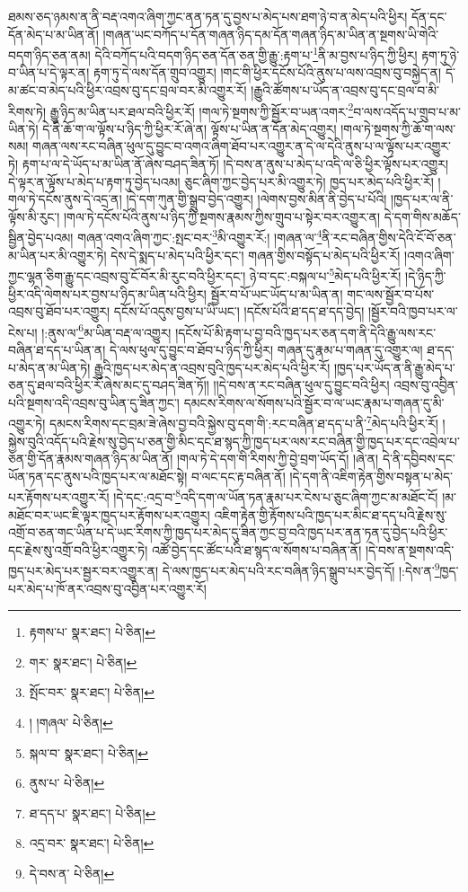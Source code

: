 ཐམས་ཅད་ཉམས་ན་ནི་བརྡ་འགའ་ཞིག་ཀྱང་ནན་ཏན་དུ་བྱས་པ་མེད་པས་ཐག་ཉེ་བ་ན་མེད་པའི་ཕྱིར། དོན་དང་དོན་མེད་པ་མ་ཡིན་ནོ། །གཞན་ཡང་བཀོད་པ་དོན་གཞན་ཉིད་དམ་དོན་གཞན་ཉིད་མ་ཡིན་ན་སྔགས་ཡི་གེའི་བདག་ཉིད་ཅན་ནམ། དེའི་བཀོད་པའི་བདག་ཉིད་ཅན་དོན་ཅན་གྱི་རྒྱུ་:རྟག་པ་\footnote{རྟགས་པ་  སྣར་ཐང་།  པེ་ཅིན། }ནི་མ་བྱས་པ་ཉིད་ཀྱི་ཕྱིར། རྟག་ཏུ་ཉེ་བ་ཡིན་པ་དེ་ལྟར་ན། རྟག་ཏུ་དེ་ལས་དོན་གྲུབ་འགྱུར། །གང་གི་ཕྱིར་དངོས་པོའི་ནུས་པ་ལས་འབྲས་བུ་བསྐྱེད་ན། དེ་མ་ཚང་བ་མེད་པའི་ཕྱིར་འབྲས་བུ་དང་བྲལ་བར་མི་འགྱུར་རོ། །རྒྱུའི་ཚོགས་པ་ཡོད་ན་འབྲས་བུ་དང་བྲལ་བ་མི་རིགས་ཏེ། རྒྱུ་ཉིད་མ་ཡིན་པར་ཐལ་བའི་ཕྱིར་རོ། །གལ་ཏེ་སྔགས་ཀྱི་སྦྱོར་བ་ཡན་འགར་\footnote{གར་  སྣར་ཐང་།  པེ་ཅིན། }བ་ལས་འདོད་པ་གྲུབ་པ་མ་ཡིན་ཏེ། དེ་ནི་ཆོ་ག་ལ་ལྟོས་པ་ཉིད་ཀྱི་ཕྱིར་རོ་ཞེ་ན། ལྟོས་པ་ཡིན་ན་དོན་མེད་འགྱུར། །གལ་ཏེ་སྔགས་ཀྱི་ཆོ་ག་ལས་སམ། གཞན་ལས་རང་བཞིན་ཕུལ་དུ་བྱུང་བ་འགའ་ཞིག་ཐོབ་པར་འགྱུར་ན་དེ་ལ་དེའི་ནུས་པ་ལ་ལྟོས་པར་འགྱུར་ཏེ། རྟག་པ་ལ་དེ་ཡོད་པ་མ་ཡིན་ནོ་ཞེས་བཤད་ཟིན་ཏོ། །དེ་བས་ན་ནུས་པ་མེད་པ་འདི་ལ་ཅི་ཕྱིར་ལྟོས་པར་འགྱུར། དེ་ལྟར་ན་ལྟོས་པ་མེད་པ་རྟག་ཏུ་བྱེད་པའམ། ཅུང་ཞིག་ཀྱང་བྱེད་པར་མི་འགྱུར་ཏེ། ཁྱད་པར་མེད་པའི་ཕྱིར་རོ། །གལ་ཏེ་དངོས་ནུས་དེ་འདྲ་ན། །དེ་དག་ཀུན་གྱི་སྒྲུབ་བྱེད་འགྱུར། །ལེགས་བྱས་མིན་ནི་བྱེད་པ་པོའི། །ཁྱད་པར་ལ་ནི་ལྟོས་མི་རུང་། །གལ་ཏེ་དངོས་པོའི་ནུས་པ་ཉིད་ཀྱི་སྔགས་རྣམས་ཀྱིས་གྲུབ་པ་སྟེར་བར་འགྱུར་ན། དེ་དག་གིས་མཆོད་སྦྱིན་བྱེད་པའམ། གཞན་འགའ་ཞིག་ཀྱང་:སྤང་བར་\footnote{སྤོང་བར་  སྣར་ཐང་།  པེ་ཅིན། }མི་འགྱུར་རོ:། །གཞན་ལ་\footnote{། །གཞལ་  པེ་ཅིན། }ནི་རང་བཞིན་གྱིས་དེའི་ངོ་བོ་ཅན་མ་ཡིན་པར་མི་འགྱུར་ཏེ། དེས་དེ་སྨད་པ་མེད་པའི་ཕྱིར་དང་། གཞན་གྱིས་བསྟོད་པ་མེད་པའི་ཕྱིར་རོ། །འགའ་ཞིག་ཀྱང་ལྷན་ཅིག་རྒྱུ་དང་འབྲས་བུ་ངོ་བོར་མི་རུང་བའི་ཕྱིར་དང་། ཉེ་བ་དང་:བསྐལ་པ་\footnote{སྐལ་བ་  སྣར་ཐང་།  པེ་ཅིན། }མེད་པའི་ཕྱིར་རོ། །དེ་ཉིད་ཀྱི་ཕྱིར་འདི་ལེགས་པར་བྱས་པ་ཉིད་མ་ཡིན་པའི་ཕྱིར། སྦྱོར་བ་པོ་ཡང་ཡོད་པ་མ་ཡིན་ན། གང་ལས་སྦྱོར་བ་པོས་འབྲས་བུ་ཐོབ་པར་འགྱུར། དངོས་པོ་འདུས་བྱས་པ་ཡི་ཡང་། །དངོས་པོའི་ཐ་དད་ཐ་དད་བྱེད། །སྦྱོར་བའི་ཁྱབ་པར་ལ་ངེས་པ། །:ནུས་ལ་\footnote{ནུས་པ་  པེ་ཅིན། }མ་ཡིན་བརྡ་ལ་འགྱུར། །དངོས་པོ་མི་རྟག་པ་བྱ་བའི་ཁྱད་པར་ཅན་དག་ནི་དེའི་རྒྱུ་ལས་རང་བཞིན་ཐ་དད་པ་ཡིན་ན། དེ་ལས་ཕུལ་དུ་བྱུང་བ་ཐོབ་པ་ཉིད་ཀྱི་ཕྱིར། གཞན་དུ་རྣམ་པ་གཞན་དུ་འགྱུར་ལ། ཐ་དད་པ་མེད་ན་མ་ཡིན་ཏེ། རྒྱུའི་ཁྱད་པར་མེད་ན་འབྲས་བུའི་ཁྱད་པར་མེད་པའི་ཕྱིར་རོ། །ཁྱད་པར་ཡོད་ན་ནི་རྒྱུ་མེད་པ་ཅན་དུ་ཐལ་བའི་ཕྱིར་རོ་ཞེས་མང་དུ་བཤད་ཟིན་ཏོ།། །།དེ་བས་ན་རང་བཞིན་ཕུལ་དུ་བྱུང་བའི་ཕྱིར། འབྲས་བུ་འབྱིན་པའི་སྔགས་འདི་འབྲས་བུ་ཡིན་དུ་ཟིན་ཀྱང་། དམངས་རིགས་ལ་སོགས་པའི་སྦྱོར་བ་ལ་ཡང་རྣམ་པ་གཞན་དུ་མི་འགྱུར་ཏེ། དམངས་རིགས་དང་བྲམ་ཟེ་ཞེས་བྱ་བའི་སྐྱེས་བུ་དག་གི་:རང་བཞིན་ཐ་དད་པ་ནི་\footnote{ཐ་དད་པ་  སྣར་ཐང་།  པེ་ཅིན། }མེད་པའི་ཕྱིར་རོ། །སྐྱེས་བུའི་འདོད་པའི་རྗེས་སུ་བྱེད་པ་ཅན་གྱི་མིང་དང་ཐ་སྙད་ཀྱི་ཁྱད་པར་ལས་རང་བཞིན་གྱི་ཁྱད་པར་དང་འབྲེལ་པ་ཅན་གྱི་དོན་རྣམས་གཞན་ཉིད་མ་ཡིན་ནོ། །གལ་ཏེ་དེ་དག་གི་རིགས་ཀྱི་བྱེ་བྲག་ཡོད་དོ། །ཞེ་ན། དེ་ནི་དབྱིབས་དང་ཡོན་ཏན་དང་ནུས་པའི་ཁྱད་པར་ལ་མཐོང་སྟེ། བ་ལང་དང་རྟ་བཞིན་ནོ། །དེ་དག་ནི་འཇིག་རྟེན་གྱིས་བསྟན་པ་མེད་པར་རྟོགས་པར་འགྱུར་རོ། །དེ་དང་:འདྲ་བ་\footnote{འདྲ་བར་  སྣར་ཐང་།  པེ་ཅིན། }འདི་དག་ལ་ཡོན་ཏན་རྣམ་པར་ངེས་པ་ཅུང་ཞིག་ཀྱང་མ་མཐོང་ངོ། །མ་མཐོང་བར་ཡང་ཇི་ལྟར་ཁྱད་པར་རྟོགས་པར་འགྱུར། འཇིག་རྟེན་གྱི་རྟོགས་པའི་ཁྱད་པར་མིང་ཐ་དད་པའི་རྗེས་སུ་འགྲོ་བ་ཅན་གང་ཡིན་པ་དེ་ཡང་རིགས་ཀྱི་ཁྱད་པར་མེད་དུ་ཟིན་ཀྱང་བྱ་བའི་ཁྱད་པར་ནན་ཏན་དུ་བྱེད་པའི་ཕྱིར་དང་རྗེས་སུ་འགྲོ་བའི་ཕྱིར་འགྱུར་ཏེ། འཚོ་བྱེད་དང་ཚོང་པའི་ཐ་སྙད་ལ་སོགས་པ་བཞིན་ནོ། །དེ་བས་ན་སྔགས་འདི་ཁྱད་པར་མེད་པར་སྦྱར་བར་འགྱུར་ན། དེ་ལས་ཁྱད་པར་མེད་པའི་རང་བཞིན་ཉིད་སྒྲུབ་པར་བྱེད་དོ། །:དེས་ན་\footnote{དེ་བས་ན་  པེ་ཅིན། }ཁྱད་པར་མེད་པ་ཁོ་ནར་འབྲས་བུ་འབྱིན་པར་འགྱུར་རོ། 